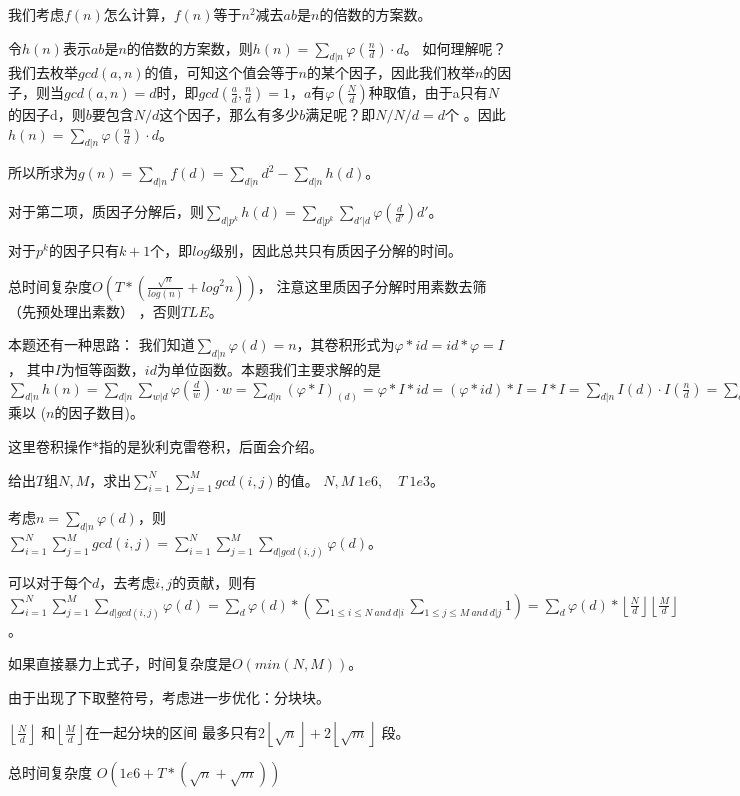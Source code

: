 \begin{solution}
我们考虑$f(n)$怎么计算，$f(n)$等于$n^2$减去$ab$是$n$的倍数的方案数。

令$h(n)$表示$ab$是$n$的倍数的方案数，则$h(n)=\sum_{d|n}\varphi(\frac{n}{d})\cdot d$。      
如何理解呢？我们去枚举$gcd(a,n)$的值，可知这个值会等于$n$的某个因子，因此我们枚举$n$的因子，则当$gcd(a,n)=d$时，即$gcd(\frac{a}{d},\frac{n}{d})=1 $，$a$有$\varphi(\frac{N}{d})$种取值，由于a只有$N$的因子d，则$b$要包含$N/d$这个因子，那么有多少$b$满足呢？即$N/N/d=d$个 。因此$h(n)=\sum_{d|n}\varphi(\frac{n}{d})\cdot d$。 

所以所求为$g(n)=\sum_{d|n}f(d)=\sum_{d|n}d^2-\sum_{d|n}h(d)$。  

对于第二项，质因子分解后，则$\sum_{d|p^k}h(d)=\sum_{d|p^k}\sum_{d'|d}\varphi(\frac{d}{d'})d'$。 

对于$p^k$的因子只有$k+1$个，即$log$级别，因此总共只有质因子分解的时间。

{\heiti 总时间复杂度$O(T*(\frac{\sqrt{n}}{log(n)}+log^2n))$}， 注意这里质因子分解时用素数去筛（先预处理出素数） ，否则$TLE$。

{\heiti 本题还有一种思路：}  我们知道$\sum_{d|n}\varphi(d)=n$，其卷积形式为$\varphi * id=id*\varphi =I$，  其中$I$为恒等函数，$id$为单位函数。本题我们主要求解的是$\sum_{d|n}h(n)=\sum_{d|n}\sum_{w|d}\varphi(\frac{d}{w})\cdot w=
\sum_{d|n}(\varphi * I)_{(d)}=\varphi* I *id=(\varphi* id )*I=I*I= \sum_{d|n}I(d)\cdot 
I(\frac{n}{d})=\sum_{d|n}d\cdot \frac{n}{d}=\sum_{d|n}n=n\cdot \sum_{d|n}1 =n$ 乘以 ($n$的因子数目)。     

\begin{note}
这里卷积操作$*$指的是狄利克雷卷积，后面会介绍。
\end{note}

\end{solution}

\vbox{}

\begin{example}
给出$T$组$N,M$，求出$\sum_{i=1}^{N}\sum_{j=1}^Mgcd(i,j)$的值。 $N,M \ 1e6,\quad T\ 1e3$。
\end{example}

\begin{solution}
考虑$n=\sum_{d|n}\varphi(d)$，则$\sum_{i=1}^{N}\sum_{j=1}^Mgcd(i,j)=\sum_{i=1}^{N}\sum_{j=1}^M  \sum_{d|gcd(i,j)}\varphi(d)$。 

可以对于每个$d$，去考虑$i,j$的贡献，则有$\sum_{i=1}^{N}\sum_{j=1}^M  \sum_{d|gcd(i,j)}\varphi(d)=\sum_d\varphi(d)*(\sum_{1\le i\le N \ and \ d|i}  \sum_{1\le j\le M \ and \ d|j}1)  =\sum_d\varphi(d)* \left \lfloor \frac{N}{d}\right \rfloor  \left \lfloor \frac{M}{d}\right \rfloor$。

如果直接暴力上式子，时间复杂度是$O(min(N,M))$。   

由于出现了下取整符号，考虑进一步优化：分块块。

$\left \lfloor \frac{N}{d} \right \rfloor$ 和$\left \lfloor \frac{M}{d}\right \rfloor$在一起分块的区间
最多只有$2\left \lfloor \sqrt{n}\right \rfloor+2\left \lfloor \sqrt{m}\right \rfloor$ 段。

{\heiti 总时间复杂度}    $O(1e6+T*(\sqrt{n}+\sqrt{m}))$    
\end{solution}

